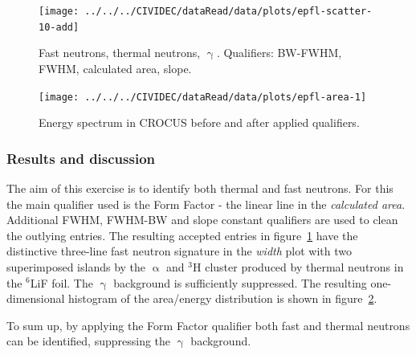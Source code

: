 \clearpage
\begin{figure}[]
\centering
\texttt{[image: ../../../CIVIDEC/dataRead/data/plots/epfl-scatter-10-add]}
\caption{Fast neutrons, thermal neutrons, $\upgamma$. Qualifiers: BW-FWHM, FWHM, calculated area, slope.}
\label{fig:scatterepfl2}
\end{figure}

\clearpage
\begin{figure}[!t]
\centering
\texttt{[image: ../../../CIVIDEC/dataRead/data/plots/epfl-area-1]}
\caption{Energy spectrum in CROCUS before and after applied qualifiers.}
\label{fig:scatterepfl2area}
\end{figure}


\subsubsection{Results and discussion}
The aim of this exercise is to identify both thermal and fast neutrons. For this the main qualifier used is the Form Factor - the linear line in the \emph{calculated area}. Additional FWHM, FWHM-BW and slope constant qualifiers are used to clean the outlying entries. The resulting accepted entries in figure~\ref{fig:scatterepfl2} have the distinctive three-line fast neutron signature in the \emph{width} plot with two superimposed islands by the $\upalpha$ and $^3$H cluster produced by thermal neutrons in the $^6$LiF foil. The $\upgamma$ background is sufficiently suppressed. The resulting one-dimensional histogram of the area/energy distribution is shown in figure~\ref{fig:scatterepfl2area}.

To sum up, by applying the Form Factor qualifier both fast and thermal neutrons can be identified, suppressing the $\upgamma$ background.



\clearpage
